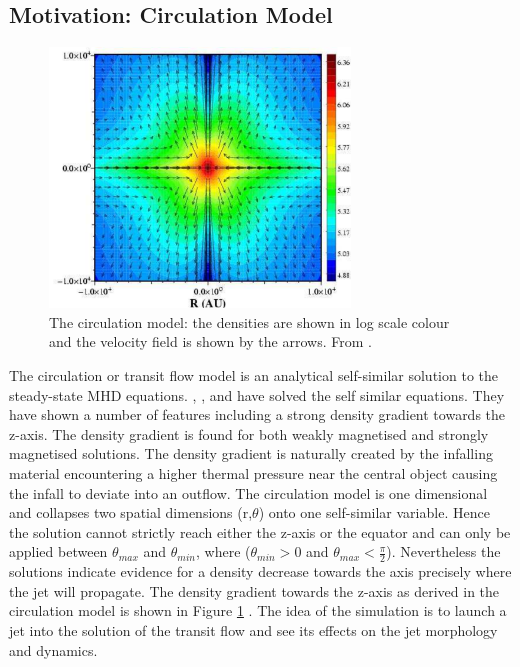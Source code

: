 \subsection{Motivation: Circulation Model}

\begin{figure}[t]
\centering
\includegraphics[width=8cm]{circulation}
\caption{
The circulation model: the densities are shown in log scale colour and the velocity field is shown by the arrows. From \citet{2006ApJ...637..798C}.
}
\label{fig:circulation}       %
\end{figure}

The circulation or transit flow model is an analytical self-similar solution to the steady-state MHD equations. 
\citet{1996MNRAS.281.1038F}, \citet{1999A&A...350..254L}, \citet{2002A&A...387..187L} and \citet{2006ApJ...637..798C} have solved the self similar equations.
They have shown a number of features including a strong density gradient towards the z-axis.
The density gradient is found for both weakly magnetised and strongly magnetised solutions.
The density gradient is naturally created by the infalling material encountering a higher thermal pressure near the central object causing the infall to deviate into an outflow.
The circulation model is one dimensional and collapses two spatial dimensions (r,$\theta$) onto one self-similar variable. 
Hence the solution cannot strictly reach either the z-axis or the equator and can only be applied between $\theta_{max}$ and $\theta_{min}$, where ($\theta_{min} > 0$ and $\theta_{max} < \frac{\pi}{2}$).
Nevertheless the solutions indicate evidence for a density decrease towards the axis precisely where the jet will propagate.
The density gradient towards the z-axis as derived in the circulation model 
is shown in Figure \ref{fig:circulation} 
\citep{2006ApJ...637..798C}. 
The idea of the simulation is to launch a jet into the solution of the transit flow and see its effects on the jet morphology and dynamics.

